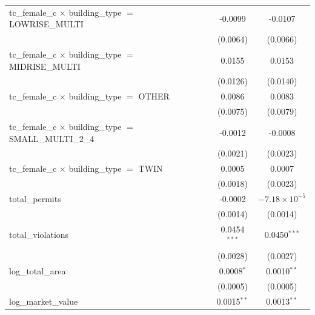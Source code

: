 \begin{tabular}{lcc}
   tc\_female\_c $\times$ building\_type $=$ LOWRISE\_MULTI            & -0.0099                & -0.0107\\   
                                                                       & (0.0064)               & (0.0066)\\   
   tc\_female\_c $\times$ building\_type $=$ MIDRISE\_MULTI            & 0.0155                 & 0.0153\\   
                                                                       & (0.0126)               & (0.0140)\\   
   tc\_female\_c $\times$ building\_type $=$ OTHER                     & 0.0086                 & 0.0083\\   
                                                                       & (0.0075)               & (0.0079)\\   
   tc\_female\_c $\times$ building\_type $=$ SMALL\_MULTI\_2\_4        & -0.0012                & -0.0008\\   
                                                                       & (0.0021)               & (0.0023)\\   
   tc\_female\_c $\times$ building\_type $=$ TWIN                      & 0.0005                 & 0.0007\\   
                                                                       & (0.0018)               & (0.0023)\\   
   total\_permits                                                      & -0.0002                & $-7.18\times 10^{-5}$\\    
                                                                       & (0.0014)               & (0.0014)\\   
   total\_violations                                                   & 0.0454$^{***}$         & 0.0450$^{***}$\\   
                                                                       & (0.0028)               & (0.0027)\\   
   log\_total\_area                                                    & 0.0008$^{*}$           & 0.0010$^{**}$\\   
                                                                       & (0.0005)               & (0.0005)\\   
   log\_market\_value                                                  & 0.0015$^{**}$          & 0.0013$^{**}$\\   

\end{tabular}
